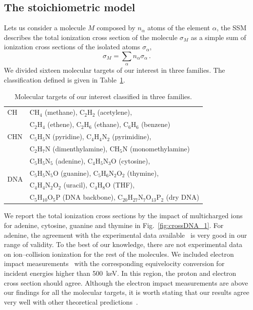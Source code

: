 \documentclass[preprint,12pt]{article}
\begin{document}
\subsection{The stoichiometric model}

Lets us consider a molecule $M$ composed by $n_{\alpha}$ atoms of the
element $\alpha$, the SSM describes the total ionization cross section 
of the molecule $\sigma_{M}$ as a simple sum of ionization cross 
sections of the isolated atoms $\sigma_{\alpha}$, 
\begin{equation}
 \sigma_{M}=\sum\limits_{\alpha}n_{\alpha}\sigma_{\alpha}\,.  
 \label{eq:sumion}
\end{equation}
We divided sixteen molecular targets of our interest in three families. 
The classification defined is given in Table~\ref{tab:families}.

\begin{table}[H]
\begin{center}
\begin{tabular}{|p{}|p{}|}
\hline
 CH  & CH$_4$ (methane), C$_2$H$_2$ (acetylene), \\
     & C$_2$H$_4$ (ethene), C$_2$H$_6$ (ethane), C$_6$H$_6$ (benzene) \\
\hline
 CHN & C$_5$H$_5$N (pyridine), C$_4$H$_4$N$_2$ (pyrimidine), \\
& C$_2$H$_7$N 
(dimenthylamine), CH$_5$N (monomethylamine) \\
\hline
 \multirow{4}{*}{DNA} 
     & C$_5$H$_5$N$_5$ (adenine), C$_4$H$_5$N$_3$O (cytosine), \\
     & C$_5$H$_5$N$_5$O (guanine), C$_5$H$_6$N$_2$O$_2$ (thymine), \\
     & C$_4$H$_4$N$_2$O$_2$ (uracil), C$_4$H$_8$O (THF), \\
     & C$_5$H$_{10}$O$_5$P (DNA backbone), C$_{20}$H$_{27}$N$_7$O$_{13}$P$_2$ (dry DNA) \\
\hline
\end{tabular}
\caption{Molecular targets of our interest classified in three families.}
\label{tab:families}
\end{center}
\end{table}

We report the total ionization cross sections by the impact of 
multicharged ions for adenine, cytosine, guanine and thymine in 
Fig.~\ref{fig:crossDNA_1}. For adenine, the agreement with the 
experimental data available~\cite{iriki2011} is very good 
in our range of validity. To the best of our knowledge, there are not 
experimental data on ion--collision ionization for the rest of the 
molecules. We included electron impact measurements~\cite{rahman2016} 
with the corresponding equivelocity 
conversion for incident energies higher than 500~keV. In this region, 
the proton and electron cross section should agree. Although the electron 
impact measurements are above our findings for all the molecular targets, 
it is worth stating that our results agree very well with other 
theoretical predictions~\cite{mozejko2003,tan2018}. 
\end{document}
